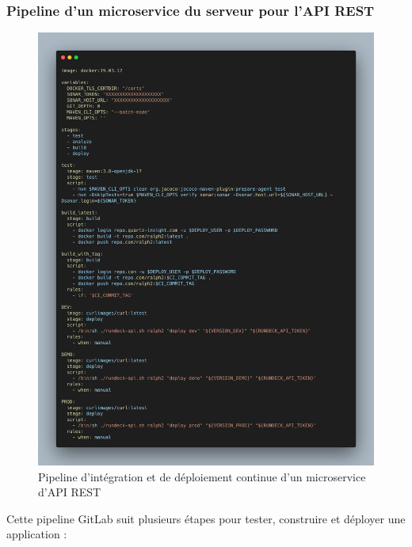 \documentclass[a4paper, 11pt]{report}
\begin{document}
\subsubsection{Pipeline d'un microservice du serveur pour l'API REST}
  \begin{figure}[H]
      \centering
      \includegraphics[scale=0.35,center]{screenshots/CICD-ralph.png}
      \caption{Pipeline d'intégration et de déploiement continue d'un microservice d'API REST}
  \end{figure}
  Cette pipeline GitLab suit plusieurs étapes pour tester, construire et
déployer une application :
\end{document}
